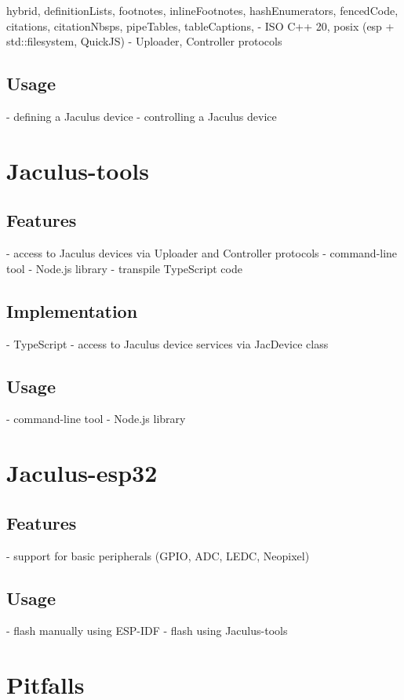 \documentclass[
  digital,
  oneside,
  nosansbold,
  nocolorbold,
  lof,
  lot
]{fithesis4}
\begin{document}
\begin{markdown*}{%
  hybrid,
  definitionLists,
  footnotes,
  inlineFootnotes,
  hashEnumerators,
  fencedCode,
  citations,
  citationNbsps,
  pipeTables,
  tableCaptions,
}
  - ISO C++ 20, posix (esp + std::filesystem, QuickJS)
  - Uploader, Controller protocols

\section{Usage}

  - defining a Jaculus device
  - controlling a Jaculus device


\chapter{Jaculus-tools}

\section{Features}

  - access to Jaculus devices via Uploader and Controller protocols
  - command-line tool
  - Node.js library
  - transpile TypeScript code

\section{Implementation}

  - TypeScript
  - access to Jaculus device services via JacDevice class

\section{Usage}

  - command-line tool
  - Node.js library


\chapter{Jaculus-esp32}

\section{Features}

  - support for basic peripherals (GPIO, ADC, LEDC, Neopixel)

\section{Usage}

  - flash manually using ESP-IDF
  - flash using Jaculus-tools


\chapter{Pitfalls}


\end{markdown*}
\end{document}
